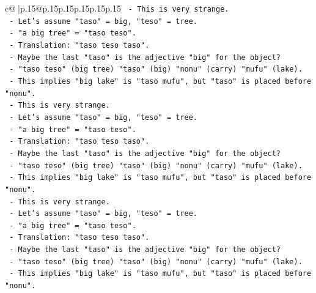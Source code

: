 \documentclass{article}
\begin{document}
{\begin{supertabular}{c@{$\;$}|p{.15\linewidth}@{}p{.15\linewidth}p{.15\linewidth}p{.15\linewidth}p{.15\linewidth}p{.15\linewidth}}
{{{\texttt{                            {-} This is very strange.} \\
\texttt{                            {-} Let's assume "taso" = big, "teso" = tree.} \\
\texttt{                            {-} "a big tree" = "taso teso".} \\
\texttt{                            {-} Translation: "taso teso taso".} \\
\texttt{                            {-} Maybe the last "taso" is the adjective "big" for the object?} \\
\texttt{                            {-} "taso teso" (big tree) "taso" (big) "nonu" (carry) "mufu" (lake).} \\
\texttt{                            {-} This implies "big lake" is "taso mufu", but "taso" is placed before "nonu".} \\
\texttt{                            {-} This is very strange.} \\
\texttt{                            {-} Let's assume "taso" = big, "teso" = tree.} \\
\texttt{                            {-} "a big tree" = "taso teso".} \\
\texttt{                            {-} Translation: "taso teso taso".} \\
\texttt{                            {-} Maybe the last "taso" is the adjective "big" for the object?} \\
\texttt{                            {-} "taso teso" (big tree) "taso" (big) "nonu" (carry) "mufu" (lake).} \\
\texttt{                            {-} This implies "big lake" is "taso mufu", but "taso" is placed before "nonu".} \\
\texttt{                            {-} This is very strange.} \\
\texttt{                            {-} Let's assume "taso" = big, "teso" = tree.} \\
\texttt{                            {-} "a big tree" = "taso teso".} \\
\texttt{                            {-} Translation: "taso teso taso".} \\
\texttt{                            {-} Maybe the last "taso" is the adjective "big" for the object?} \\
\texttt{                            {-} "taso teso" (big tree) "taso" (big) "nonu" (carry) "mufu" (lake).} \\
\texttt{                            {-} This implies "big lake" is "taso mufu", but "taso" is placed before "nonu".} \\
}}}
\end{supertabular}}
\end{document}
